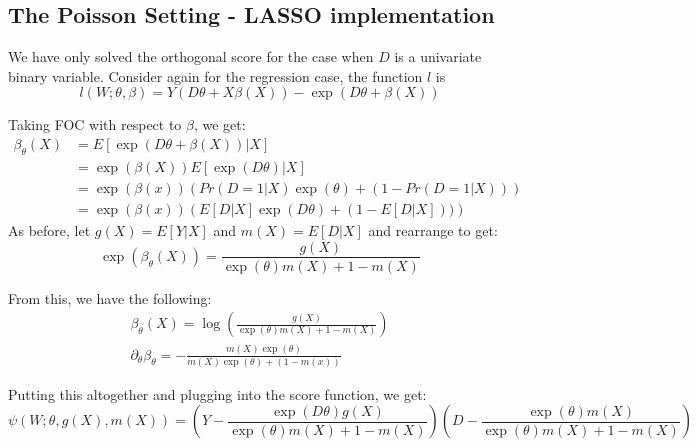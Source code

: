 \documentclass[11pt]{article}
\begin{document}
\subsection{The Poisson Setting - LASSO implementation}
We have only solved the orthogonal score for the case when $D$ is a univariate binary variable. Consider again for the regression case, the function $l$ is
\begin{equation*}
	l(W; \theta, \beta) = Y(D\theta + X\beta(X)) - \exp(D\theta + \beta(X))
\end{equation*}

\noindent Taking FOC with respect to $\beta$, we get:
\begin{align*}
	\beta_\theta(X) &= E[\exp(D\theta + \beta(X)) | X] \\
  &= \exp(\beta(X)) E[\exp(D\theta)|X] \\
  &= \exp(\beta(x)) \left(Pr(D = 1 | X)\exp(\theta) + (1 - Pr(D = 1 | X))\right) \\
	&= \exp(\beta(x)) \left(E[D | X]\exp(D\theta) + (1-E[D|X]))\right)
\end{align*}
As before, let $g(X) = E[Y|X]$ and $m(X) = E[D|X]$ and rearrange to get:
$$\exp \left(\beta_{\theta}(X)\right)=\frac{g(X)}{\exp (\theta) m(X)+1-m(X)}$$

From this, we have the following:
\begin{gather*}
	\beta_\theta(X) = \log\left(\frac{g(X)}{\exp (\theta) m(X)+1-m(X)}\right) \\
  \partial_\theta \beta_\theta = -\frac{m(X)\exp(\theta)}{m(X)\exp(\theta) + (1-m(x))}
\end{gather*}

Putting this altogether and plugging into the score function, we get:
$$\psi(W ; \theta, g(X), m(X))=\left(Y-\frac{\exp (D \theta) g(X)}{\exp (\theta) m(X)+1-m(X)}\right)\left(D-\frac{\exp (\theta) m(X)}{\exp (\theta) m(X)+1-m(X)}\right)$$
\end{document}
